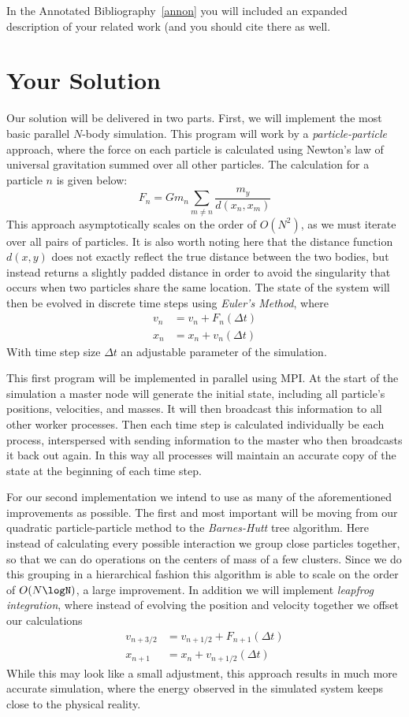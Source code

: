 \documentclass[11pt]{article}
\begin{document}
In the Annotated Bibliography~\ref{annon} you will included an expanded description of your related work (and you should cite there as well.

\section {Your Solution}\label{soln}
Our solution will be delivered in two parts. First, we will implement the most basic parallel $N$-body simulation. This program will work by a \emph{particle-particle} approach, where the force on each particle is calculated using Newton's law of universal gravitation summed over all other particles. The calculation for a particle $n$ is given below:
\[
    F_n = Gm_n\sum_{m \neq n}\frac{m_y}{d(x_n,x_m)}
\]
This approach asymptotically scales on the order of $O(N^2)$, as we must iterate over all pairs of particles. It is also worth noting here that the distance function $d(x,y)$ does not exactly reflect the true distance between the two bodies, but instead returns a slightly padded distance in order to avoid the singularity that occurs when two particles share the same location. The state of the system will then be evolved in discrete time steps using \emph{Euler's Method}, where
\begin{align*}
v_n &= v_n + F_n(\Delta t) \\
x_n &= x_n + v_n(\Delta t)
\end{align*}
With time step size $\Delta t$ an adjustable parameter of the simulation.

This first program will be implemented in parallel using MPI. At the start of the simulation a master node will generate the initial state, including all particle's positions, velocities, and masses. It will then broadcast this information to all other worker processes. Then each time step is calculated individually be each process, interspersed with sending information to the master who then broadcasts it back out again. In this way all processes will maintain an accurate copy of the state at the beginning of each time step.

For our second implementation we intend to use as many of the aforementioned improvements as possible. The first and most important will be moving from our quadratic particle-particle method to the \emph{Barnes-Hutt} tree algorithm. Here instead of calculating every possible interaction we group close particles together, so that we can do operations on the centers of mass of a few clusters. Since we do this grouping in a hierarchical fashion this algorithm is able to scale on the order of $O(N\logN)$, a large improvement. In addition we will implement \emph{leapfrog integration}, where instead of evolving the position and velocity together we offset our calculations
\begin{align*}
v_{n + 3/2} &= v_{n + 1/2} + F_{n+1}(\Delta t) \\
x_{n+1} &= x_n + v_{n+1/2}(\Delta t)
\end{align*}
While this may look like a small adjustment, this approach results in much more accurate simulation, where the energy observed in the simulated system keeps close to the physical reality. 
\end{document}
